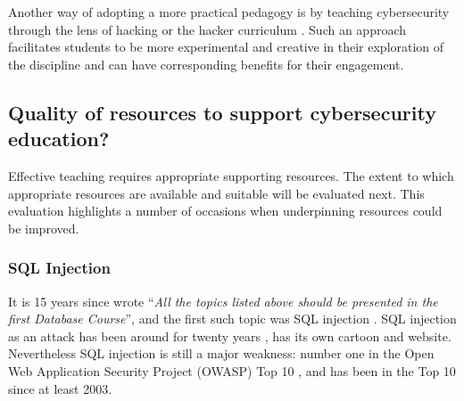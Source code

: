 \documentclass[sigconf]{acmart}
\begin{document}
Another way of adopting a more practical pedagogy is by teaching cybersecurity through the lens of hacking or the hacker curriculum \cite{bratus2010teaching}. Such an approach facilitates students to be more experimental and creative in their exploration of the discipline and can have corresponding benefits for their engagement. 

\begin{comment}


It is an interesting question as to whether standards such as PCI DSS should be addressed within degree courses (clearly degree courses can never cover all standards) or whether they should be addressed in professional training courses. However, the current situation is not ideal from the perspective of industry (or users of systems). The inclusion of key standards could be seen as a valuable enhancement activity to how cybersecurity it taught.

\end{comment}

\subsection{Quality of resources to support cybersecurity education?}
Effective teaching requires appropriate supporting resources. The extent to which appropriate resources are available and suitable will be evaluated next. This evaluation highlights a number of occasions when underpinning resources could be improved.

\subsubsection{SQL Injection}
It is 15 years since \cite{Guimaraesetal2004} wrote ``{\emph{All the topics listed above should be presented in the first Database Course}}'', and the first such topic was SQL injection \cite{SPIDynamics2002,Anonymous2018b}. SQL injection as an attack has been around for twenty years \cite{HornerHyslip2017a}, has its own cartoon and website. Nevertheless SQL injection is still a major weakness: number one in the Open Web Application Security Project (OWASP) Top 10 \cite{OWASP2017a}, and has been in the Top 10 since at least 2003. 
\end{document}
